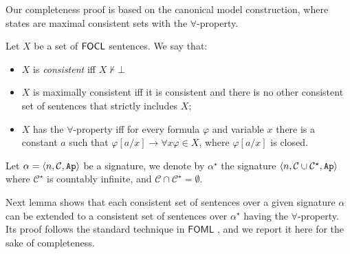 \documentclass[sigconf,anonymous]{aamas}
\begin{document}
Our completeness proof is based on the canonical model construction, where states are maximal consistent sets with the $\forall$-property.

\begin{definition}
Let $X$ be a set of $\mathsf{FOCL}$ sentences. We say that: 
\begin{itemize}
    \item $X$ is \emph{consistent} iff $X\not\vdash \bot$
    \item $X$ is maximally consistent iff it is consistent and there is no other consistent set of sentences that strictly includes $X$; 
\item $X$ has the $\forall$-property iff for every formula $\varphi$  and variable $x$ there is a constant $a$ such that $\varphi[a/x]\to \forall x \varphi\in X$, where $\varphi[a/x]$ is closed. 

    \end{itemize}

  
\end{definition}


Let $\alpha=\langle n,\mathcal{C},\texttt{Ap} \rangle$ be a signature,  we denote by $\alpha^\star$ the signature $\langle n,\mathcal{C}\cup \mathcal{C}^\star,\texttt{Ap} \rangle$ where $\mathcal{C}^\star$ is countably infinite, and $\mathcal{C}\cap \mathcal{C}^\star = \emptyset$. 

Next lemma shows  that each consistent set of sentences over a given signature $\alpha$  can be extended to a consistent set of sentences over $\alpha^\star$ having the $\forall$-property.  Its proof follows the standard technique in $\mathsf{FOML}$ \cite{Cresswell1996-CREANI-3}, and we report it here for the sake of completeness. 
\end{document}
